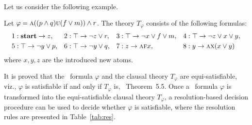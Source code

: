 \documentclass[twoside,11pt]{article}
\begin{document}
Let us consider the following example.
\begin{example}
\label{examp:Tran}
	Let $\varphi=\textsc{a}((p\wedge q) \textsc{u} (f\vee m)) \wedge r$. The theory $T_{\varphi}$ consists of the following formulas:
	 \begin{align*}
	 &  1: \textbf{start}\rightarrow z, &&  2: \top \rightarrow \neg z \vee r, &&  3:\top \rightarrow \neg x\vee f \vee m, &&
	    4: \top \rightarrow \neg z \vee x \vee y, \\
     &  5: \top \rightarrow \neg y \vee p, &&  6: \top \rightarrow \neg y \vee q, &&  7:  z \rightarrow \textsc{a} \textsc{f} x, &&  8: y \rightarrow \textsc{a} \textsc{x}(x\vee y)
	 \end{align*}
    where $x,y,z$ are the introduced new atoms.
\end{example}


It is proved that the \CTL\ formula $\varphi$ and the clausal theory $T_\varphi$ are equi-satisfiable, viz.,
$\varphi$ is satisfiable if and only if $T_\varphi$ is, \cf\ Theorem~5.5.
Once a \CTL\ formula $\varphi$ is transformed into the equi-satisfiable
clausal theory $T_\varphi$, a resolution-based decision procedure
 can be used to decide whether $\varphi$ is satisfiable, where
 the resolution rules are presented in Table~\ref{tab:res}.
\end{document}
